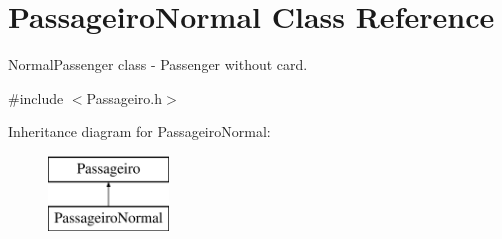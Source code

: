 \hypertarget{class_passageiro_normal}{}\section{Passageiro\+Normal Class Reference}
\label{class_passageiro_normal}


Normal\+Passenger class -\/ Passenger without card.  




{\ttfamily \#include $<$Passageiro.\+h$>$}

Inheritance diagram for Passageiro\+Normal\+:\begin{figure}[H]
\begin{center}
\leavevmode
\includegraphics[height=2.000000cm]{class_passageiro_normal}
\end{center}
\end{figure}
